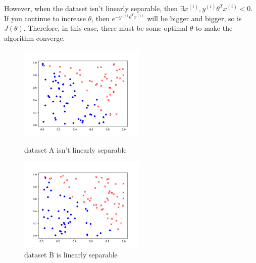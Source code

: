 \begin{answer}
    However, when the dataset isn't linearly separable, then $\exists x^{(i)},y^{(i)}\theta^T x^{(i)} < 0$.
    If you continue to increase $\theta$, then $e^{-y^{(i)}\theta^T x^{(i)}}$ will be bigger and bigger, 
    so is $J(\theta)$. Therefore, in this case, there must be some optimal $\theta$ to make the algorithm converge.
    \begin{figure}[htbp]
        \centering
        \begin{minipage}[t]{0.48\textwidth}
            \centering
            \includegraphics[width=6cm]{../src/output/dataset1_a.png}
            \caption{dataset A isn't linearly separable}
        \end{minipage}
        \centering
        \begin{minipage}[t]{0.48\textwidth}
            \centering
            \includegraphics[width=6cm]{../src/output/dataset1_b.png}
            \caption{dataset B is linearly separable}
        \end{minipage}
    \end{figure}
\end{answer}
